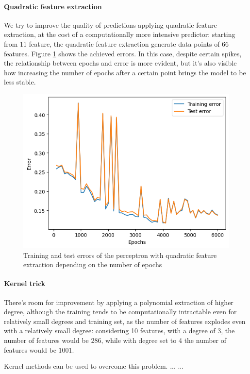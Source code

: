 \documentclass{article}
\begin{document}
\paragraph{Quadratic feature extraction}
We try to improve the quality of predictions applying quadratic feature extraction, at the cost of a computationally more intensive predictor: starting from 11 feature, the quadratic feature extraction generate data points of 66 features. 
Figure \ref{fig:quad_perceptron} shows the achieved errors. In this case, despite certain spikes, the relationship between epochs and error is more evident, but it's also visible how increasing the number of epochs after a certain point brings the model to be less stable.

\begin{figure}
	\centering
	\includegraphics[width=0.8\columnwidth]{../plots/quad_perceptron.png}
	\caption{Training and test errors of the perceptron with quadratic feature extraction depending on the number of epochs}
	\label{fig:quad_perceptron}
\end{figure}

\paragraph{Kernel trick}
There's room for improvement by applying a polynomial extraction of higher degree, although the training tends to be computationally intractable even for relatively small degrees and training set, as the number of features explodes even with a relatively small degree: considering 10 features, with a degree of 3, the number of features would be 286, while with degree set to 4 the number of features would be 1001.

Kernel methods can be used to overcome this problem.
...
...
\end{document}
